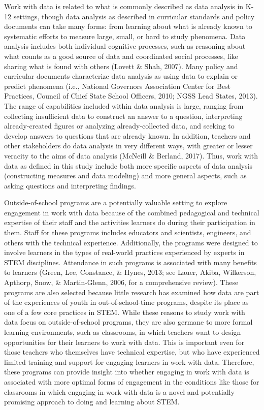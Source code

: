 \documentclass[]{msu-thesis}
\theoremstyle{definition}
\theoremstyle{definition}
\theoremstyle{definition}
\theoremstyle{remark}
\begin{document}
Work with data is related to what is commonly described as data analysis
in K-12 settings, though data analysis as described in curricular
standards and policy documents can take many forms: from learning about
what is already known to systematic efforts to measure large, small, or
hard to study phenomena. Data analysis includes both individual
cognitive processes, such as reasoning about what counts as a good
source of data and coordinated social processes, like sharing what is
found with others (Lovett \& Shah, 2007). Many policy and curricular
documents characterize data analysis as using data to explain or predict
phenomena (i.e., National Governors Association Center for Best
Practices, Council of Chief State School Officers, 2010; NGSS Lead
States, 2013). The range of capabilities included within data analysis
is large, ranging from collecting insufficient data to construct an
answer to a question, interpreting already-created figures or analyzing
already-collected data, and seeking to develop answers to questions that
are already known. In addition, teachers and other stakeholders do data
analysis in very different ways, with greater or lesser veracity to the
aims of data analysis (McNeill \& Berland, 2017). Thus, work with data
as defined in this study include both more specific aspects of data
analysis (constructing measures and data modeling) and more general
aspects, such as asking questions and interpreting findings.

Outside-of-school programs are a potentially valuable setting to explore
engagement in work with data because of the combined pedagogical and
technical expertise of their staff and the activities learners do during
their participation in them. Staff for these programs includes educators
and scientists, engineers, and others with the technical experience.
Additionally, the programs were designed to involve learners in the
types of real-world practices experienced by experts in STEM
disciplines. Attendance in such programs is associated with many
benefits to learners (Green, Lee, Constance, \& Hynes, 2013; see Lauer,
Akiba, Wilkerson, Apthorp, Snow, \& Martin-Glenn, 2006, for a
comprehensive review). These programs are also selected because little
research has examined how data are part of the experiences of youth in
out-of-school-time programs, despite its place as one of a few core
practices in STEM. While these reasons to study work with data focus on
outside-of-school programs, they are also germane to more formal
learning environments, such as classrooms, in which teachers want to
design opportunities for their learners to work with data. This is
important even for those teachers who themselves have technical
expertise, but who have experienced limited training and support for
engaging learners in work with data. Therefore, these programs can
provide insight into whether engaging in work with data is associated
with more optimal forms of engagement in the conditions like those for
classrooms in which engaging in work with data is a novel and
potentially promising approach to doing and learning about STEM.
\end{document}
